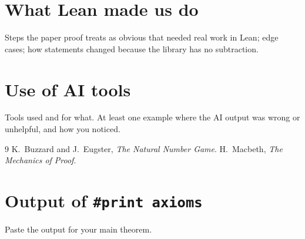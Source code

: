 \documentclass[11pt]{article}
\theoremstyle{definition}
\begin{document}
\section{What Lean made us do}
Steps the paper proof treats as obvious that needed real work in Lean; edge cases; how
statements changed because the library has no subtraction.

\section{Use of AI tools}
Tools used and for what. At least one example where the AI output was wrong or unhelpful,
and how you noticed.

\begin{thebibliography}{9}
 K.~Buzzard and J.~Eugster, \emph{The Natural Number Game}.
 H.~Macbeth, \emph{The Mechanics of Proof}.
\end{thebibliography}

\appendix
\section{Output of \texttt{\#print axioms}}
Paste the output for your main theorem.
\end{document}
